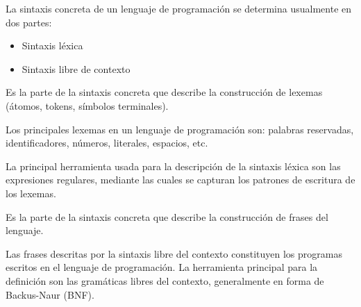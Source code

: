 \documentclass[12pt]{extarticle}
\begin{document}
\newpage
La sintaxis concreta de un lenguaje de programación se determina usualmente en dos partes:
\begin{itemize}
    \item Sintaxis léxica
    \item Sintaxis libre de contexto
\end{itemize}

\begin{definition} Es la parte de la sintaxis concreta que describe la construcción de lexemas (átomos, tokens, símbolos terminales).
\end{definition}

Los principales lexemas en un lenguaje de programación son: palabras reservadas, identificadores, números, literales, espacios, etc. 

La principal herramienta usada para la descripción de la sintaxis léxica son las expresiones regulares, mediante las cuales se capturan los patrones de escritura de los lexemas. 

\begin{definition} Es la parte de la sintaxis concreta que describe la construcción de frases del lenguaje.
\end{definition}

Las frases descritas por la sintaxis libre del contexto constituyen los programas escritos en el lenguaje de programación.  La herramienta principal para la definición son las gramáticas libres del contexto, generalmente en forma de Backus-Naur (BNF).
\end{document}
